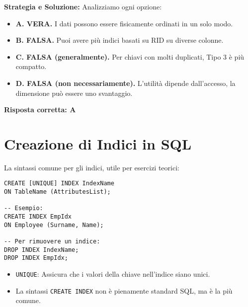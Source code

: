 \textbf{Strategia e Soluzione:}
Analizziamo ogni opzione:
\begin{itemize}
    \item \textbf{A. VERA.} I dati possono essere fisicamente ordinati in un solo modo.
    \item \textbf{B. FALSA.} Puoi avere più indici basati su RID su diverse colonne.
    \item \textbf{C. FALSA (generalmente).} Per chiavi con molti duplicati, Tipo 3 è più compatto.
    \item \textbf{D. FALSA (non necessariamente).} L'utilità dipende dall'accesso, la dimensione può essere uno svantaggio.
\end{itemize}
\textbf{Risposta corretta: A}

\section{Creazione di Indici in SQL}
La sintassi comune per gli indici, utile per esercizi teorici:
\begin{verbatim}
CREATE [UNIQUE] INDEX IndexName
ON TableName (AttributesList);

-- Esempio:
CREATE INDEX EmpIdx
ON Employee (Surname, Name);

-- Per rimuovere un indice:
DROP INDEX IndexName;
DROP INDEX EmpIdx;
\end{verbatim}
\begin{itemize}
    \item \texttt{UNIQUE}: Assicura che i valori della chiave nell'indice siano unici.
    \item La sintassi \texttt{CREATE INDEX} non è pienamente standard SQL, ma è la più comune.
\end{itemize}

